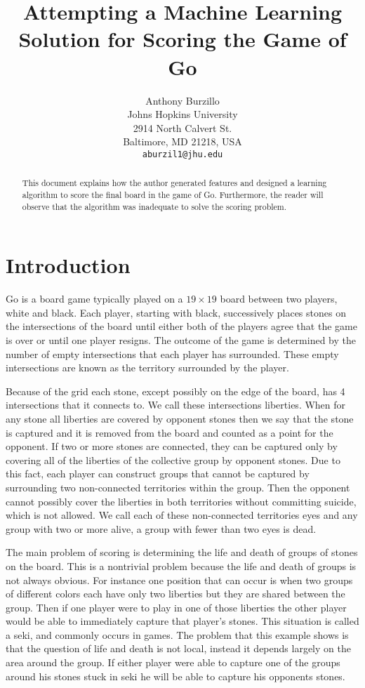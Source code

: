 \documentclass[11pt,letterpaper]{article}
\title{Attempting a Machine Learning Solution for Scoring the Game of Go}
\author{Anthony Burzillo\\
  Johns Hopkins University\\
  2914 North Calvert St.\\
  Baltimore, MD 21218, USA\\
  {\tt aburzil1@jhu.edu}}
\date{}
\begin{document}
\maketitle

\begin{abstract}
  This document explains how the author generated features and designed a learning algorithm to score the final board in the
  game of Go. Furthermore, the reader will observe that the algorithm was inadequate to solve the scoring problem.
\end{abstract}

\section{Introduction}

Go is a board game typically played on a $19 \times 19$ board between two players, white and black. Each player, starting with
black, successively places stones on the intersections of the board until either both of the players agree that the game is over
or until one player resigns. The outcome of the game is determined by the number of empty intersections that each player has
surrounded. These empty intersections are known as the territory surrounded by the player.

Because of the grid each stone, except possibly on the edge of the board, has 4 intersections that it connects to. We call these
intersections liberties. When for any stone all liberties are covered by opponent stones then we say that the stone is captured and
it is removed from the board and counted as a point for the opponent. If two or more stones are connected, they can be captured
only by covering all of the liberties of the collective group by opponent stones. Due to this fact, each player can construct groups
that cannot be captured by surrounding two non-connected territories within the group. Then the opponent cannot possibly cover
the liberties in both territories without committing suicide, which is not allowed. We call each of these non-connected territories
eyes and any group with two or more alive, a group with fewer than two eyes is dead.

The main problem of scoring is determining the life and death of groups of stones on the board. This is a nontrivial problem
because the life and death of groups is not always obvious. For instance one position that can occur is when two groups of
different colors each have only two liberties but they are shared between the group. Then if one player were to play in one of
those liberties the other player would be able to immediately capture that player's stones. This situation is called a seki, and
commonly occurs in games. The problem that this example shows is that the question of life and death is not local, instead it
depends largely on the area around the group. If either player were able to capture one of the groups around his stones stuck in
seki he will be able to capture his opponents stones.
\end{document}
